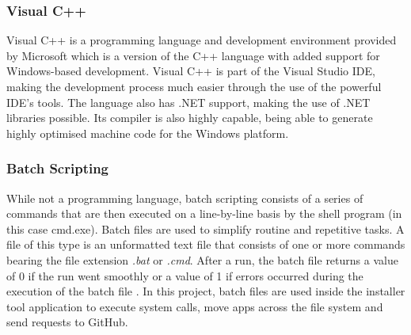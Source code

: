 \subsubsection{Visual C++}
Visual C++ is a programming language and development environment provided by Microsoft which is a version of the C++ language with added support for Windows-based development. Visual C++ is part of the Visual Studio IDE, making the development process much easier through the use of the powerful IDE's tools. The language also has .NET support, making the use of .NET libraries possible. Its compiler is also highly capable, being able to generate highly optimised machine code for the Windows platform.

\subsubsection{Batch Scripting}
While not a programming language, batch scripting consists of a series of commands that are then executed on a line-by-line basis by the shell program (in this case cmd.exe). Batch files are used to simplify routine and repetitive tasks. A file of this type is an unformatted text file that consists of one or more commands bearing the file extension \textit{.bat} or \textit{.cmd}. After a run, the batch file returns a value of 0 if the run went smoothly or a value of 1 if errors occurred during the execution of the batch file \cite{batch_files}. In this project, batch files are used inside the installer tool application to execute system calls, move apps across the file system and send requests to GitHub.
\vspace{\baselineskip}\newline


